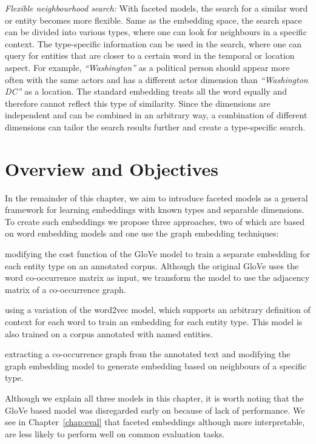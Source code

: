 \emph{Flexible neighbourhood search:} With faceted models, the search for a similar word or entity becomes more flexible. Same as the embedding space, the search space can be divided into various types, where one can look for neighbours in a specific context. The type-specific information can be used in the search, where one can query for entities that are closer to a certain word in the temporal or location aspect. For example, \emph{``Washington''} as a political person should appear more often with the same actors and has a different actor dimension than \emph{``Washington DC''} as a location. The standard embedding treats all the word equally and therefore cannot reflect this type of similarity. Since the dimensions are independent and can be combined in an arbitrary way, a combination of different dimensions can tailor the search results further and create a type-specific search. 


\section{Overview and Objectives}\label{sec:faceted_overview}
In the remainder of this chapter, we aim to introduce faceted models as a general framework for learning embeddings with known types and separable dimensions. To create such embeddings we propose three approaches, two of which are based on word embedding models and one use the graph embedding techniques: 
\begin{compactenum}
\item modifying the cost function of the GloVe model to train a separate embedding for each entity type on an annotated corpus. Although the original GloVe uses the word co-occurrence matrix as input, we transform the model to use the adjacency matrix of a co-occurrence graph. 
\item using a variation of the word2vec model, which supports an arbitrary definition of context for each word to train an embedding for each entity type. This model is also trained on a corpus annotated with named entities. 
\item extracting a co-occurrence graph from the annotated text and modifying the graph embedding model to generate embedding based on neighbours of a specific type. 
\end{compactenum}
Although we explain all three models in this chapter, it is worth noting that the GloVe based model was disregarded early on because of lack of performance. We see in Chapter~\ref{chap:eval} that faceted embeddings although more interpretable, are less likely to perform well on common evaluation tasks. 
